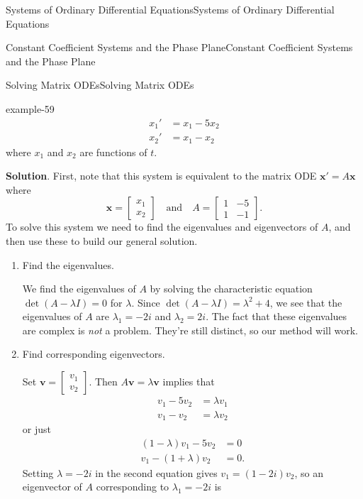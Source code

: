 \documentclass[10pt,]{book}
\numberwithin{equation}{section}
\renewcommand{\vec}[1]{\mathbf{#1}}
\newcommand{\qq}[1]{\quad\text{#1}\quad}
\newcommand{\amp}{&}
\begin{document}
\begin{chapterptx}{Systems of Ordinary Differential Equations}{}{Systems of Ordinary Differential Equations}{}{}
\begin{sectionptx}{Constant Coefficient Systems and the Phase Plane}{}{Constant Coefficient Systems and the Phase Plane}{}{}
\begin{subsectionptx}{Solving Matrix ODEs}{}{Solving Matrix ODEs}{}{}
\begin{example}{}{example-59}
\begin{align*}
x_{1}' \amp = x_{1} - 5x_{2}\\
x_{2}' \amp = x_{1} - x_{2}
\end{align*}
where \(x_{1}\) and \(x_{2}\) are functions of \(t\).%
\par\smallskip%
\noindent\textbf{Solution}.\hypertarget{solution-56}{}\quad%
\hypertarget{p-348}{}%
First, note that this system is equivalent to the matrix ODE \(\vec{x}' = A\vec{x}\) where%
\begin{equation*}
\vec{x} = \begin{bmatrix}x_{1} \\ x_{2}\end{bmatrix}\qq{and} A = \begin{bmatrix}1 \amp  -5 \\ 1 \amp  -1\end{bmatrix}.
\end{equation*}
To solve this system we need to find the eigenvalues and eigenvectors of \(A\), and then use these to build our general solution. \leavevmode%
\begin{enumerate}
\item\hypertarget{li-20}{}\hypertarget{p-349}{}%
Find the eigenvalues.%
\par
\hypertarget{p-350}{}%
We find the eigenvalues of \(A\) by solving the characteristic equation \(\det(A - \lambda I) = 0\) for \(\lambda\). Since \(\det(A - \lambda I) = \lambda^{2}+4\), we see that the eigenvalues of \(A\) are \(\lambda_{1} = -2i\) and \(\lambda_{2} = 2i\). The fact that these eigenvalues are complex is \emph{not} a problem. They're still distinct, so our method will work.%
\item\hypertarget{li-21}{}\hypertarget{p-351}{}%
Find corresponding eigenvectors.%
\par
\hypertarget{p-352}{}%
Set \(\vec{v} = \begin{bmatrix}v_{1} \\ v_{2}\end{bmatrix}\). Then \(A\vec{v} = \lambda\vec{v}\) implies that%
\begin{align*}
v_{1} - 5v_{2}  \amp =  \lambda v_{1}\\
v_{1} -v_{2}  \amp =  \lambda v_{2}
\end{align*}
or just%
\begin{align*}
(1-\lambda)v_{1} - 5v_{2} \amp =0\\
v_{1} - (1+\lambda)v_{2} \amp = 0.
\end{align*}
Setting \(\lambda=-2i\) in the second equation gives \(v_{1} = (1-2i)v_{2}\), so an eigenvector of \(A\) corresponding to \(\lambda_{1} = -2i\) is%

\end{enumerate}
\end{example}
\end{subsectionptx}
\end{sectionptx}
\end{chapterptx}
\end{document}
